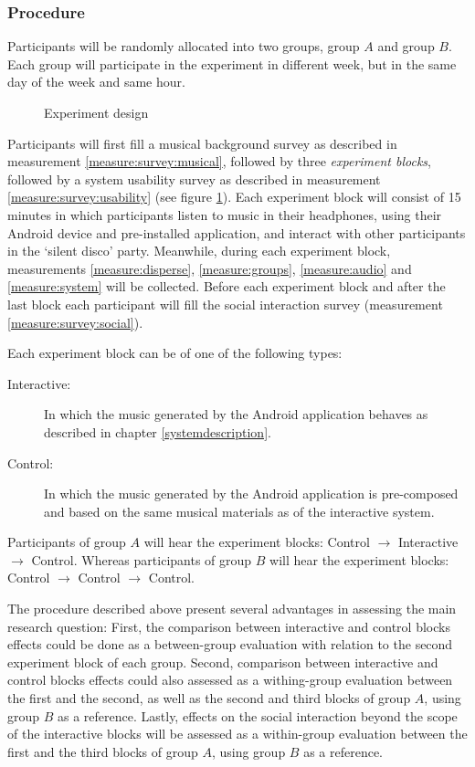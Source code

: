 \documentclass[a4paper,11pt]{article}
\newcommand{\definition}[1]{\emph{#1}}
\begin{document}
\subsubsection{Procedure}

Participants will be randomly allocated into two groups, group $A$ and group $B$\@.
Each group will participate in the experiment in different week, but in the same day of the week and same hour.

\begin{figure}[!htb]
	\centering
	\def\svgwidth{0.8\textwidth}
  	
	\caption{Experiment design}\label{fig:experiment}
\end{figure}

Participants will first fill a musical background survey as described in measurement \ref{measure:survey:musical}, followed by three \definition{experiment blocks}, followed by a system usability survey as described in measurement \ref{measure:survey:usability} (see figure \ref{fig:experiment}).
Each experiment block will consist of 15 minutes in which participants listen to music in their headphones, using their Android device and pre-installed application, and interact with other participants in the `silent disco' party.
Meanwhile, during each experiment block, measurements \ref{measure:disperse}, \ref{measure:groups}, \ref{measure:audio} and \ref{measure:system} will be collected.
Before each experiment block and after the last block each participant will fill the social interaction survey (measurement \ref{measure:survey:social}).

Each experiment block can be of one of the following types:
\begin{description}
	\item[Interactive:] In which the music generated by the Android application behaves as described in chapter \ref{systemdescription}.
	\item[Control:] In which the music generated by the Android application is pre-composed and based on the same musical materials as of the interactive system.
\end{description}

Participants of group $A$ will hear the experiment blocks: Control $\rightarrow$ Interactive $\rightarrow$ Control. Whereas participants of group $B$ will hear the experiment blocks: Control $\rightarrow$ Control $\rightarrow$ Control.

The procedure described above present several advantages in assessing the main research question:
First, the comparison between interactive and control blocks effects could be done as a between-group evaluation with relation to the second experiment block of each group.
Second, comparison between interactive and control blocks effects could also assessed as a withing-group evaluation between the first and the second, as well as the second and third blocks of group $A$, using group $B$ as a reference.
Lastly, effects on the social interaction beyond the scope of the interactive blocks will be assessed as a within-group evaluation between the first and the third blocks of group $A$, using group $B$ as a reference.
\end{document}
